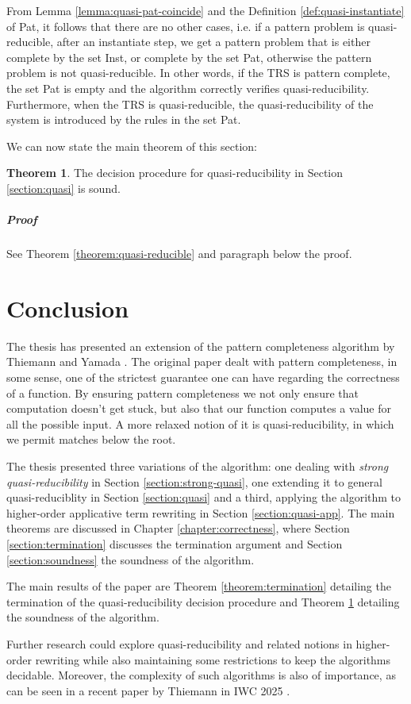 \documentclass{report}
\theoremstyle{definition}
\newtheorem{theorem_inner}{Theorem}
\newenvironment{theorem}
  {\begin{customblock}\begin{theorem_inner}}
  {\end{theorem_inner}\end{customblock}}
\begin{document}
From Lemma \ref{lemma:quasi-pat-coincide} and the Definition \ref{def:quasi-instantiate} of Pat, it follows that there are no other cases, i.e. if a pattern problem is quasi-reducible, after an instantiate step, we get a pattern problem that is either complete by the set Inst, or complete by the set Pat, otherwise the pattern problem is not quasi-reducible. In other words, if the TRS is pattern complete, the set Pat is empty and the algorithm correctly verifies quasi-reducibility. Furthermore, when the TRS is quasi-reducible, the quasi-reducibility of the system is introduced by the rules in the set Pat.

We can now state the main theorem of this section:

\begin{theorem}\label{theorem:soundness}
    The decision procedure for quasi-reducibility in Section \ref{section:quasi} is sound.

    \paragraph{Proof} See Theorem \ref{theorem:quasi-reducible} and paragraph below the proof.
\end{theorem}

\chapter{Conclusion}\label{chapter:conclusion}
The thesis has presented an extension of the pattern completeness algorithm by Thiemann and Yamada \cite{thiemann}. The original paper dealt with pattern completeness, in some sense, one of the strictest guarantee one can have regarding the correctness of a function. By ensuring pattern completeness we not only ensure that computation doesn't get stuck, but also that our function computes a value for all the possible input. A more relaxed notion of it is quasi-reducibility, in which we permit matches below the root. 

The thesis presented three variations of the algorithm: one dealing with \textit{strong quasi-reducibility} in Section \ref{section:strong-quasi}, one extending it to general quasi-reduciblity in Section \ref{section:quasi} and a third, applying the algorithm to higher-order applicative term rewriting in Section \ref{section:quasi-app}. The main theorems are discussed in Chapter \ref{chapter:correctness}, where Section \ref{section:termination} discusses the termination argument and Section \ref{section:soundness} the soundness of the algorithm.

The main results of the paper are Theorem \ref{theorem:termination} detailing the termination of the quasi-reducibility decision procedure and Theorem \ref{theorem:soundness} detailing the soundness of the algorithm.

Further research could explore quasi-reducibility and related notions in higher-order rewriting while also maintaining some restrictions to keep the algorithms decidable. Moreover, the complexity of such algorithms is also of importance, as can be seen in a recent paper by Thiemann in IWC 2025 \cite{iwc2025}.
\printbibliography
\end{document}
